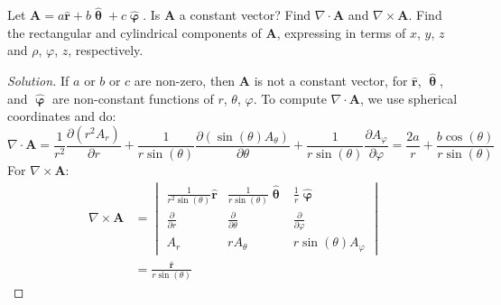 \documentclass[crop=false,class=article,oneside]{standalone}
\begin{document}
        \begin{problem}[Wangsness 1-20]
            Let
            $\mathbf{A}%
             =a\hat{\mathbf{r}}%
             +b\hat{\boldsymbol{\uptheta}}%
             +c\hat{\boldsymbol{\upvarphi}}$.
            Is $\mathbf{A}$ a constant vector? Find
            $\nabla\cdot\mathbf{A}$ and
            $\nabla\times\mathbf{A}$. Find the rectangular
            and cylindrical components of $\mathbf{A}$,
            expressing in terms of $x$, $y$, $z$ and
            $\rho$, $\varphi$, $z$, respectively.
        \end{problem}
        \begin{proof}[Solution]
            If $a$ or $b$ or $c$ are non-zero,
            then $\mathbf{A}$ is not a constant
            vector, for $\hat{\mathbf{r}}$,
            $\hat{\boldsymbol{\uptheta}}$, and
            $\hat{\boldsymbol{\upvarphi}}$ are
            non-constant functions of
            $r$, $\theta$, $\varphi$.
            To compute $\nabla\cdot\mathbf{A}$,
            we use spherical coordinates and do:
            \begin{equation*}
                \nabla\cdot\mathbf{A}
                =\frac{1}{r^{2}}
                \frac{\partial(r^{2}A_{r})}{\partial{r}}
                +\frac{1}{r\sin(\theta)}
                \frac{\partial(\sin(\theta)A_{\theta})}
                     {\partial\theta}
                +\frac{1}{r\sin(\theta)}
                \frac{\partial A_{\varphi}}{\partial\varphi}
                =\frac{2a}{r}
                +\frac{b\cos(\theta)}{r\sin(\theta)}
            \end{equation*}
            For $\nabla\times\mathbf{A}$:
            \begin{align*}
                \nabla\times\mathbf{A}
                &=
                \begin{vmatrix}
                    \frac{1}{r^{2}\sin(\theta)}\hat{\mathbf{r}}
                    &\frac{1}{r\sin(\theta)}\hat{\boldsymbol{\uptheta}}
                    &\frac{1}{r}\hat{\boldsymbol{\upvarphi}}\\
                    \frac{\partial}{\partial{r}}
                    &\frac{\partial}{\partial\theta}
                    &\frac{\partial}{\partial\varphi}\\
                    A_{r}
                    &rA_{\theta}
                    &r\sin(\theta)A_{\varphi}
                \end{vmatrix}\\
                &=\frac{\hat{\mathbf{r}}}{r\sin(\theta)}

\end{align*}
\end{proof}
\end{document}
